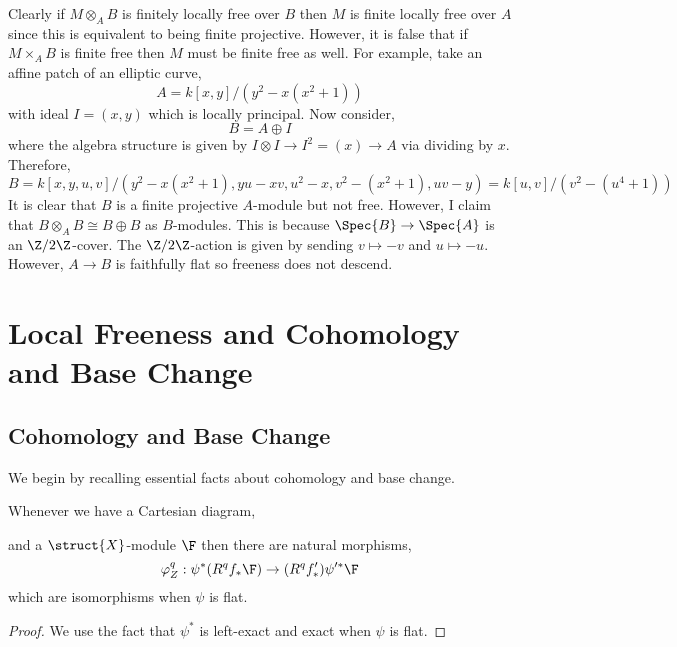 \documentclass[12pt]{article}
\begin{document}
\begin{rmk}
Clearly if $M \otimes_A B$ is finitely locally free over $B$ then $M$ is finite locally free over $A$ since this is equivalent to being finite projective. However, it is false that if $M \times_A B$ is finite free then $M$ must be finite free as well. For example, take an affine patch of an elliptic curve,
\[ A = k[x,y]/(y^2 - x(x^2 + 1)) \] 
with ideal $I = (x, y)$ which is locally principal. Now consider,
\[ B = A \oplus I \] 
where the algebra structure is given by $I \otimes I \to I^2 = (x) \to A$ via dividing by $x$. Therefore,
\[ B = k[x,y,u,v]/(y^2 - x(x^2 + 1), y u - x v, u^2 - x, v^2 - (x^2 + 1), uv - y) = k[u,v]/(v^2 - (u^4  + 1)) \]
It is clear that $B$ is a finite projective $A$-module but not free. However, I claim that $B \otimes_A B \cong B \oplus B$ as $B$-modules. This is because $\Spec{B} \to \Spec{A}$ is an \etale $\Z/2\Z$-cover. The $\Z/2\Z$-action is given by sending $v \mapsto -v$ and $u \mapsto - u$. However, $A \to B$ is faithfully flat so freeness does not descend.
\end{rmk}

\section{Local Freeness and Cohomology and Base Change}

\subsection{Cohomology and Base Change}

\begin{rmk}
We begin by recalling essential facts about cohomology and base change. 
\end{rmk}

\begin{prop}
Whenever we have a Cartesian diagram,
\begin{center}
\end{center}
and a $\struct{X}$-module $\F$ then there are natural morphisms,
\[ \varphi^q_Z : \psi^* (R^q f_* \F) \to (R^q f'_*) \psi'^* \F \]
which are isomorphisms when $\psi$ is flat.
\end{prop}

\begin{proof}
We use the fact that $\psi^*$ is left-exact and exact when $\psi$ is flat.
\end{proof}
\end{document}
